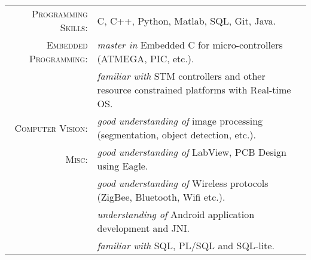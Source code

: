 %
%


 
\renewcommand{\arraystretch}{1.1}

	\begin{tabular}{>{}r>{}p{13cm}} 
		\textsc{Programming Skills:}    &  C, C++, Python, Matlab, SQL, Git, Java.\\  
		\textsc{Embedded Programming:} 	&  \emph{master in} Embedded C for micro-controllers (ATMEGA, PIC, etc.).\\
										&  \emph{familiar with} STM controllers and other resource constrained platforms with Real-time OS.\\
		\textsc{Computer Vision:}		&  \emph{good understanding of} image processing (segmentation, object detection, etc.). \\
		\textsc{Misc:}	&	\emph{good understanding of} LabView, PCB Design using Eagle.\\
						&	\emph{good understanding of} Wireless protocols (ZigBee, Bluetooth, Wifi etc.).\\
						&	\emph{understanding of}  Android application development and JNI.\\
						&	\emph{familiar with} SQL, PL/SQL and SQL-lite.\\
	\end{tabular}